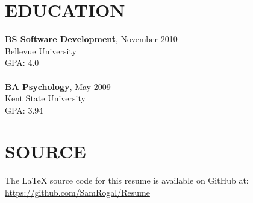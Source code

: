 \documentclass{res}
\begin{document}
\begin{resume}
	
	
\section{EDUCATION}
    \textbf{BS Software Development}, November 2010 \\
    Bellevue University \\    
    GPA: 4.0 \\  
    \\
    \textbf{BA Psychology}, May 2009 \\
    Kent State University \\    
    GPA: 3.94
	
	
\section{SOURCE}
	The LaTeX source code for this resume is available on GitHub at: \\
	\url{https://github.com/SamRogal/Resume}
 
\end{resume}
\end{document}

